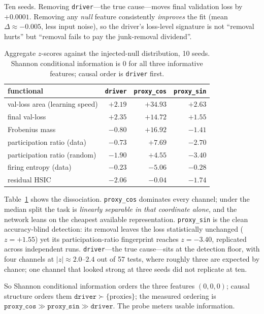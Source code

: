 Ten seeds. Removing \texttt{driver}---the true cause---moves final validation
loss by $+0.0001$. Removing any \emph{null} feature consistently \emph{improves}
the fit (mean $\Delta \approx -0.005$, less input noise), so the driver's
loss-level signature is not ``removal hurts'' but ``removal fails to pay the
junk-removal dividend''.

\begin{table}[t]\centering\small
\caption{Aggregate $z$-scores against the injected-null distribution, 10 seeds.
Shannon conditional information is $0$ for all three informative features;
causal order is \texttt{driver} first.}
\label{tab:dissociation}
\begin{tabular}{lrrr}
\toprule
functional & \texttt{driver} & \texttt{proxy\_cos} & \texttt{proxy\_sin} \\
\midrule
val-loss area (learning speed) & $+2.19$ & $\mathbf{+34.93}$ & $+2.63$ \\
final val-loss                 & $+2.35$ & $\mathbf{+14.72}$ & $+1.55$ \\
Frobenius mass                 & $-0.80$ & $\mathbf{+16.92}$ & $-1.41$ \\
participation ratio (data)     & $-0.73$ & $\mathbf{+7.69}$  & $-2.70$ \\
participation ratio (random)   & $-1.90$ & $+4.55$           & $\mathbf{-3.40}$ \\
firing entropy (data)          & $-0.23$ & $\mathbf{-5.06}$  & $-0.28$ \\
residual HSIC                  & $-2.06$ & $-0.04$           & $-1.74$ \\
\bottomrule
\end{tabular}
\end{table}

Table~\ref{tab:dissociation} shows the dissociation.
\texttt{proxy\_cos} dominates every channel; under the median split the task is
\emph{linearly separable in that coordinate alone}, and the network leans on the
cheapest available representation. \texttt{proxy\_sin} is the clean
accuracy-blind detection: its removal leaves the loss statistically unchanged
($z = +1.55$) yet its participation-ratio fingerprint reaches $z = -3.40$,
replicated across independent runs. \texttt{driver}---the true cause---sits at
the detection floor, with four channels at $|z| \approx 2.0$--$2.4$ out of 57
tests, where roughly three are expected by chance; one channel that looked
strong at three seeds did not replicate at ten.

So Shannon conditional information orders the three features $(0,0,0)$; causal
structure orders them $\texttt{driver} \succ \{\text{proxies}\}$; the measured
ordering is $\texttt{proxy\_cos} \gg \texttt{proxy\_sin} \gg \texttt{driver}$.
The probe meters usable information.

